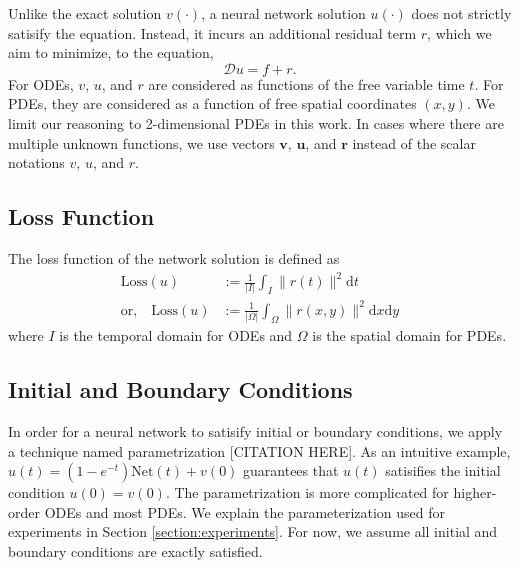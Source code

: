 \documentclass[accepted]{uai2023}
\newcommand{\vect}[1]{\boldsymbol{\mathbf{#1}}}
\newcommand{\Loss}{\mathrm{Loss}}
\newcommand{\Net}{\mathrm{Net}}
\begin{document}
    Unlike the exact solution $v(\cdot)$, a neural network solution $u(\cdot)$ does not strictly satisify the equation.
    Instead, it incurs an additional residual term $r$, which we aim to minimize, to the equation, 
    {
        \small
        \begin{equation*}
            \mathcal{D} u = f + r.
        \end{equation*}
    }
    For ODEs, $v$, $u$, and $r$ are considered as functions of the free variable time $t$.
    For PDEs, they are considered as a function of free spatial coordinates $(x, y)$.
    We limit our reasoning to 2-dimensional PDEs in this work.
    In cases where there are multiple unknown functions, we use vectors $\vect{v}$, $\vect{u}$, and $\vect{r}$ instead of the scalar notations $v$, $u$, and $r$.

\subsection{Loss Function}
    The loss function of the network solution is defined as 
    {
        \small
        \begin{align}
            \Loss{}(u) &:= \frac{1}{|I|} \int_{I} \|r(t)\|^2 \mathrm{d}t \\
            \text{or,} \quad 
            \Loss{}(u) &:= \frac{1}{|\Omega|} \int_{\Omega} \|r(x, y)\|^2 \mathrm{d}x\mathrm{d}y
        \end{align}
    }
    where $I$ is the temporal domain for ODEs and $\Omega$ is the spatial domain for PDEs.

\subsection{Initial and Boundary Conditions}\label{section:initial-and-boundary-conditions}
    In order for a neural network to satisify initial or boundary conditions, we apply a technique named parametrization [CITATION HERE]. 
    As an intuitive example, $u(t) = (1 - e^{-t}) \Net(t) + v(0)$ guarantees that $u(t)$ satisifies the initial condition $u(0)=v(0)$. 
    The parametrization is more complicated for higher-order ODEs and most PDEs. 
    We explain the parameterization used for experiments in Section \ref{section:experiments}. 
    For now, we assume all initial and boundary conditions are exactly satisfied.
\end{document}
